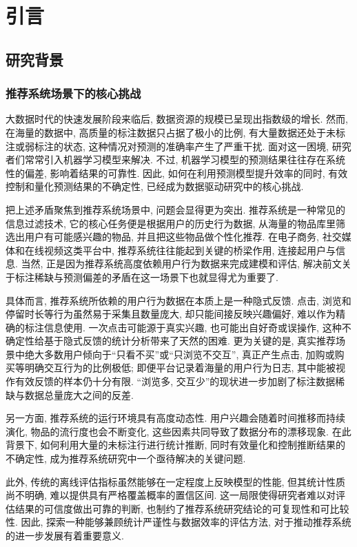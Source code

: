 \documentclass[a4paper, AutoFakeBold, UTF8]{ctexrep}
\theoremstyle{plain}
\numberwithin{equation}{chapter}
\begin{document}
  \setcounter{page}{1}
\chapter{引言}

\section{研究背景}

\subsection{推荐系统场景下的核心挑战}

大数据时代的快速发展阶段来临后, 数据资源的规模已呈现出指数级的增长. 然而, 在海量的数据中, 高质量的标注数据只占据了极小的比例, 有大量数据还处于未标注或弱标注的状态, 这种情况对预测的准确率产生了严重干扰. 面对这一困境, 研究者们常常引入机器学习模型来解决. 不过, 机器学习模型的预测结果往往存在系统性的偏差, 影响着结果的可靠性. 因此, 如何在利用预测模型提升效率的同时, 有效控制和量化预测结果的不确定性, 已经成为数据驱动研究中的核心挑战. 

把上述矛盾聚焦到推荐系统场景中, 问题会显得更为突出. 推荐系统是一种常见的信息过滤技术, 它的核心任务便是根据用户的历史行为数据, 从海量的物品库里筛选出用户有可能感兴趣的物品, 并且把这些物品做个性化推荐. 在电子商务, 社交媒体和在线视频这类平台中, 推荐系统往往能起到关键的桥梁作用, 连接起用户与信息. 当然, 正是因为推荐系统高度依赖用户行为数据来完成建模和评估, 解决前文关于标注稀缺与预测偏差的矛盾在这一场景下也就显得尤为重要了. 

具体而言, 推荐系统所依赖的用户行为数据在本质上是一种隐式反馈. 点击, 浏览和停留时长等行为虽然易于采集且数量庞大, 却只能间接反映兴趣偏好, 难以作为精确的标注信息使用. 一次点击可能源于真实兴趣, 也可能出自好奇或误操作, 这种不确定性给基于隐式反馈的统计分析带来了天然的困难. 更为关键的是, 真实推荐场景中绝大多数用户倾向于``只看不买''或``只浏览不交互'', 真正产生点击, 加购或购买等明确交互行为的比例极低; 即便平台记录着海量的用户行为日志, 其中能被视作有效反馈的样本仍十分有限. ``浏览多, 交互少''的现状进一步加剧了标注数据稀缺与数据总量庞大之间的反差. 

另一方面, 推荐系统的运行环境具有高度动态性. 用户兴趣会随着时间推移而持续演化, 物品的流行度也会不断变化, 这些因素共同导致了数据分布的漂移现象. 在此背景下, 如何利用大量的未标注行进行统计推断, 同时有效量化和控制推断结果的不确定性, 成为推荐系统研究中一个亟待解决的关键问题. 

此外, 传统的离线评估指标虽然能够在一定程度上反映模型的性能, 但其统计性质尚不明确, 难以提供具有严格覆盖概率的置信区间. 这一局限使得研究者难以对评估结果的可信度做出可靠的判断, 也制约了推荐系统研究结论的可复现性和可比较性. 因此, 探索一种能够兼顾统计严谨性与数据效率的评估方法, 对于推动推荐系统的进一步发展有着重要意义. 
\end{document}
